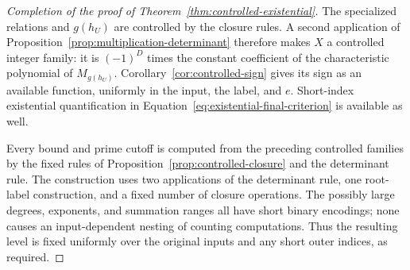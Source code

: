 \begin{proof}[Completion of the proof of
Theorem~\ref{thm:controlled-existential}]
The specialized relations and $g(h_U)$ are controlled by the closure
rules.  A second application of
Proposition~\ref{prop:multiplication-determinant} therefore makes $X$
a controlled integer family: it is $(-1)^D$ times the constant
coefficient of the characteristic polynomial of $M_{g(h_U)}$.
Corollary~\ref{cor:controlled-sign} gives its sign as an available
function, uniformly in the input, the label, and $e$.  Short-index
existential quantification in
Equation~\eqref{eq:existential-final-criterion} is available as well.

Every bound and prime cutoff is computed from the preceding controlled
families by the fixed rules of
Proposition~\ref{prop:controlled-closure} and the determinant rule.
The construction uses two applications of the determinant rule, one
root-label construction, and a fixed number of closure operations.
The possibly large degrees, exponents, and summation ranges all have
short binary encodings; none causes an input-dependent nesting of
counting computations.  Thus the resulting level is fixed uniformly
over the original inputs and any short outer indices, as required.
\end{proof}
